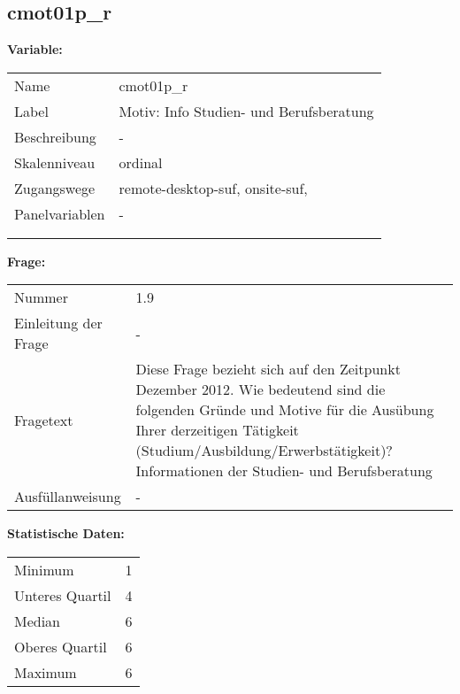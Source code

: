 	
	
	\subsection{cmot01p\_r}
	\label{subSection:cmot01p_r}

	\noindent\textbf{Variable:}\\
		\begin{tabular}{lL{11.3cm}}
			\label{tableVariable:cmot01p_r}
			Name & cmot01p\_r \\
			Label & Motiv: Info Studien- und Berufsberatung \\
			Beschreibung & - \\
			Skalenniveau & ordinal \\
			Zugangswege &
				remote-desktop-suf,
				onsite-suf,
 \\
			Panelvariablen & -
			 \\
			 \\
 \\
		\end{tabular}

		\vspace*{1 cm}
		\noindent\textbf{Frage:}\\
		\begin{tabular}{lL{11.3cm}}
			\label{tableQuestion:cmot01p_r}
			Nummer & 1.9 \\
			Einleitung der Frage & - \\
			Fragetext & Diese Frage bezieht sich auf den Zeitpunkt Dezember 2012. Wie bedeutend sind die folgenden Gründe und Motive für die Ausübung Ihrer derzeitigen Tätigkeit (Studium/Ausbildung/Erwerbstätigkeit)?
Informationen der Studien- und Berufsberatung \\
			Ausfüllanweisung & - \\
		\end{tabular}


		\vspace*{1 cm}
		\noindent\textbf{Statistische Daten:}\\
			\begin{tabular}{ll}
				\label{tableStatistics:cmot01p_r}
					Minimum & 1 \\
					Unteres Quartil & 4 \\
					Median & 6 \\
					Oberes Quartil & 6 \\
					Maximum & 6 \\
			\end{tabular}



